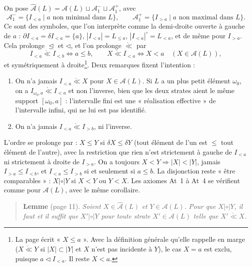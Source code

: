 \documentclass[11pt,a4paper]{article}
\begin{document}
On pose $\widehat{\mathcal{A}}(L) = \mathcal{A}(L) \sqcup \mathcal{A}_{1}^{-}
\sqcup \mathcal{A}_{1}^{+}$, avec
\[
\mathcal{A}_{1}^{-} = \{ I_{<a} \mid a \text{ non minimal dans } L\}, \qquad
\mathcal{A}_{1}^{+} = \{ I_{>a} \mid a \text{ non maximal dans } L\} .
\]
Ce sont des symboles, que l'on interprète comme la demi-droite ouverte à gauche
de $a$ : $\partial I_{<a} = \delta I_{<a} = \{a\}$, $|I_{<a}| = L_{\leq a}$,
$|I_{<a}|^{\circ} = L_{<a}$, et de même pour $I_{>a}$. Cela prolonge
$\trianglelefteq$ et $\lhd$, et l'on prolonge $\mathrel{\mathring{\ll}}$ par
\[
I_{<a} \mathrel{\mathring{\ll}} I_{<b} \iff a \leq b, \qquad X
\mathrel{\mathring{\ll}} I_{<a} \iff X < a \quad (X \in \mathcal{A}(L)),
\]
et symétriquement à droite\footnote{La page écrit « $X \leq a$ ». Avec la
définition générale qu'elle rappelle en marge ($X \mathrel{\mathring{\ll}} Y$
si $|X| \subset |Y|$ et $X$ n'est pas incidente à $Y$), le cas $X = a$ est
exclu, puisque $a \lhd I_{<a}$. Il reste $X < a$.}. Deux remarques fixent
l'intention :
\begin{enumerate}
\item[a)] On n'a jamais $I_{<a} \mathrel{\mathring{\ll}} X$ pour $X \in
\mathcal{A}(L)$. Si $L$ a un plus petit élément $\omega_{0}$, on a
$I_{\omega_{0},a} \mathrel{\mathring{\ll}} I_{<a}$ et non l'inverse, bien que
les deux strates aient le même support $[\omega_{0}, a]$ : l'intervalle fini est
une « réalisation effective » de l'intervalle infini, qui ne lui est pas
identifié.
\item[b)] On n'a jamais $I_{<a} \mathrel{\mathring{\ll}} I_{>b}$, ni l'inverse.
\end{enumerate}

L'ordre se prolonge par : $X \leq Y$ si $\delta X \leq \delta Y$ (tout élément
de l'un est $\leq$ tout élément de l'autre), avec la restriction que rien n'est
strictement à gauche de $I_{<a}$ ni strictement à droite de $I_{>a}$. On a
toujours $X < Y \Rightarrow |X| < |Y|$, jamais $I_{>a} \leq I_{<b}$, et $I_{<a}
\leq I_{>b}$ si et seulement si $a \leq b$. La disjonction reste « être
comparables » : $X \mathrel{|\circ|} Y$ si $X < Y$ ou $Y < X$. Les axiomes At~1
à At~4 se vérifient comme pour $\mathcal{A}(L)$, avec le même corollaire.

\begin{quote}
\textbf{Lemme} (page 11). \emph{Soient $X \in \widehat{\mathcal{A}}(L)$ et $Y \in
\mathcal{A}(L)$. Pour que $X \mathrel{|\circ|} Y$, il faut et il suffit que $X'
\mathrel{|\circ|} Y$ pour toute strate $X' \in \mathcal{A}(L)$ telle que $X'
\mathrel{\mathring{\ll}} X$.}
\end{quote}
\end{document}
